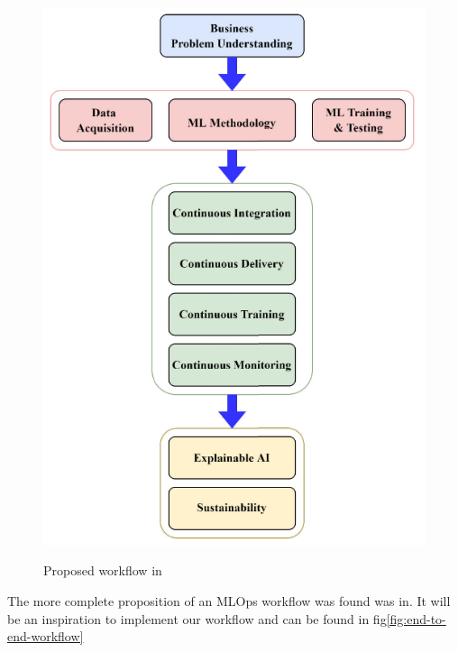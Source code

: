 \begin{figure}[!htbp]
    \caption{Proposed workflow in\cite{9792270}}
    \centering
    \includegraphics[scale=0.3]{images/taxo-workflow}
    \label{fig:taxo-workflow}
\end{figure}

The more complete proposition of an MLOps workflow was found was in\cite{Kreuzberger2022MachineLO}.
It will be an inspiration to implement our workflow and can be found in fig\ref{fig:end-to-end-workflow}

